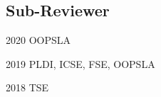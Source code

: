 \documentclass[12pt,letterpaper]{report}
\newcommand{\listitemspace}{0.15em}
\renewenvironment{itemize}
{\begin{list}{}{\setlength{\leftmargin}{0em}
			\setlength{\parskip}{0em}
			\setlength{\itemsep}{\listitemspace}
			\setlength{\parsep}{\listitemspace}}}
	{\end{list}}
\begin{document}
	\subsection*{Sub-Reviewer}
	\begin{tablist}
		\item[2020] \tab OOPSLA
		\item[2019] \tab PLDI, ICSE, FSE, OOPSLA
		\item[2018] \tab TSE
	\end{tablist}
	
	
%	
%		
%		
%		
%		
%	
%	
%		
%		
%		
%		
	
	
	
%	
%		
%		
%		
%		
%		
%		
%		
%		
%		
%		
%		
	
\end{document}
